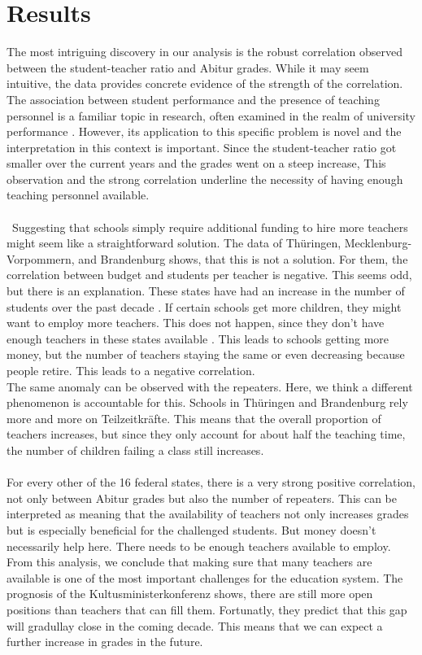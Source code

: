 \section*{Results}
The most intriguing discovery in our analysis is the robust correlation observed between the student-teacher ratio and Abitur grades.
While it may seem intuitive, the data provides concrete evidence of the strength of the correlation. 
The association between student performance and the presence of teaching personnel is a familiar topic in research, often examined in the realm of university performance \cite{doi:10.1080/00220485.1984.10845072}. However, its application to this specific problem is novel and the interpretation in this context is important. Since the student-teacher ratio got smaller over the current years and the grades went on a steep increase, This observation and the strong correlation underline the necessity of having enough teaching personnel available.\\\\\
Suggesting that schools simply require additional funding to hire more teachers might seem like a straightforward solution. The data of Thüringen, Mecklenburg-Vorpommern, and Brandenburg shows, that this is not a solution. For them, the correlation between budget and students per teacher is negative. This seems odd, but there is an explanation. These states have had an increase in the number of students over the past decade \cite{Brandenburg}\cite{Sachsen} \cite{Mecklenburg}. If certain schools get more children, they might want to employ more teachers. This does not happen, since they don't have enough teachers in these states available \cite{Kultusministerkonferenz}. This leads to schools getting more money, but the number of teachers staying the same or even decreasing because people retire. This leads to a negative correlation.\\
The same anomaly can be observed with the repeaters. Here, we think a different phenomenon is accountable for this. Schools in Thüringen and Brandenburg rely more and more on Teilzeitkräfte. This means that the overall proportion of teachers increases, but since they only account for about half the teaching time, the number of children failing a class still increases. \\\\
For every other of the 16 federal states, there is a very strong positive correlation, not only between Abitur grades but also the number of repeaters. This can be interpreted as meaning that the availability of teachers not only increases grades but is especially beneficial for the challenged students. But money doesn't necessarily help here. There needs to be enough teachers available to employ. From this analysis, we conclude that making sure that many teachers are available is one of the most important challenges for the education system. The prognosis of the Kultusministerkonferenz \cite{Kultusministerkonferenz} shows, there are still more open positions than teachers that can fill them. Fortunatly, they predict that this gap will gradullay close in the coming decade.  This means that we can expect a further increase in grades in the future. \\\\
